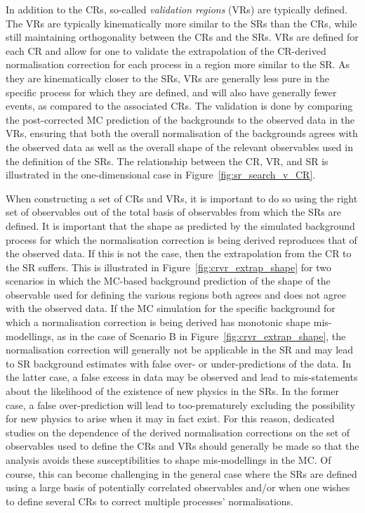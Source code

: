 In addition to the CRs, so-called \textit{validation regions} (VRs) are typically defined.
The VRs are typically kinematically more similar to the SRs than the CRs, while still maintaining orthogonality
between the CRs and the SRs.
VRs are defined for each CR and allow for one to validate the extrapolation of the CR-derived normalisation
correction for each process in a region more similar to the SR.
As they are kinematically closer to the SRs, VRs are generally less pure in the specific process for which they are defined,
and will also have generally fewer events, as compared to the associated CRs.
The validation is done by comparing the post-corrected MC prediction of the backgrounds to the
observed data in the VRs, ensuring that both the overall normalisation of the backgrounds
agrees with the observed data as well as the overall shape of the relevant observables used
in the definition of the SRs.
The relationship between the CR, VR, and SR is illustrated in the one-dimensional case in
Figure~\ref{fig:sr_search_v_CR}.

When constructing a set of CRs and VRs, it is important to do so using the right set of observables
out of the total basis of observables from which the SRs are defined.
It is important that the shape as predicted by the simulated background process for which
the normalisation correction is being derived reproduces that of the observed data.
If this is not the case, then the extrapolation from the CR to the SR suffers.
This is illustrated in Figure~\ref{fig:crvr_extrap_shape} for two scenarios in which
the MC-based background prediction of the shape of the observable used for defining
the various regions both agrees and does not agree with the observed data.
If the MC simulation for the specific background for which a normalisation correction is being derived
has monotonic shape mis-modellings, as in the case of Scenario B in Figure~\ref{fig:crvr_extrap_shape},
the normalisation correction will generally not be applicable in the SR and may lead to
SR background estimates with false over- or under-predictions of the data.
In the latter case, a false excess in data may be observed and lead to mis-statements about the
likelihood of the existence of new physics in the SRs.
In the former case, a false over-prediction will lead to too-prematurely excluding the possibility for new
physics to arise when it may in fact exist.
For this reason, dedicated studies on the dependence of the derived normalisation corrections
on the set of observables used to define the CRs and VRs should generally be made so
that the analysis avoids these susceptibilities to shape mis-modellings in the MC.
Of course, this can become challenging in the general case where the SRs are defined using a large basis of potentially
correlated observables
and/or when one wishes to define several CRs to correct multiple processes' normalisations.


